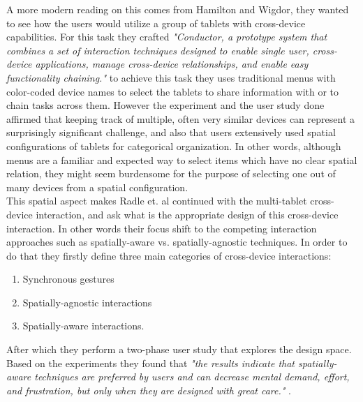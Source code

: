 A more modern reading on this comes from Hamilton and Wigdor, they wanted to see how the users would utilize a group of tablets with cross-device capabilities. For this task they crafted\emph{ "Conductor, a prototype system that combines a set of interaction techniques designed to enable single user, cross-device applications, manage cross-device relationships, and enable easy functionality chaining."} \cite{Hamilton:2014} to achieve this task they uses traditional menus with color-coded device names to select the tablets to share information with or to chain tasks across them. However the experiment and the user study done affirmed that keeping track of multiple, often very similar devices can represent a surprisingly significant challenge, and also that users extensively used spatial configurations of tablets for categorical organization. In other words, although menus are a familiar and expected way to select items which have no clear spatial relation, they might seem burdensome for the purpose of selecting one out of many devices from a spatial configuration.  \\

This spatial aspect makes Radle et. al continued with the multi-tablet cross-device interaction, and ask what is the appropriate design of this cross-device interaction. In other words their focus shift to the competing interaction approaches such as spatially-aware vs. spatially-agnostic techniques. In order to do that they firstly define three main categories of cross-device interactions: \begin{enumerate}
	\item Synchronous gestures
	\item Spatially-agnostic interactions
	\item Spatially-aware interactions. 
\end{enumerate} After which they perform a two-phase user study that explores the design space. Based on the experiments they found that \emph{"the results indicate that spatially-aware techniques are preferred by users and can decrease mental demand, effort, and frustration, but only when they are designed with great care."} \cite{Radle:2015}.\\

